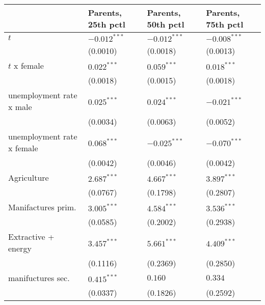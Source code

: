\begin{tabular}{llll}
\toprule
{} & Parents, 25th pctl & Parents, 50th pctl & Parents, 75th pctl \\
\midrule
$t$                                                &     $-0.012^{***}$ &     $-0.012^{***}$ &     $-0.008^{***}$ \\
                                                   &           (0.0010) &           (0.0018) &           (0.0013) \\
$t$ x female                                       &      $0.022^{***}$ &      $0.059^{***}$ &      $0.018^{***}$ \\
                                                   &           (0.0018) &           (0.0015) &           (0.0018) \\
unemployment rate x male                           &      $0.025^{***}$ &      $0.024^{***}$ &     $-0.021^{***}$ \\
                                                   &           (0.0034) &           (0.0063) &           (0.0052) \\
unemployment rate x female                         &      $0.068^{***}$ &     $-0.025^{***}$ &     $-0.070^{***}$ \\
                                                   &           (0.0042) &           (0.0046) &           (0.0042) \\
Agriculture                                        &      $2.687^{***}$ &      $4.667^{***}$ &      $3.897^{***}$ \\
                                                   &           (0.0767) &           (0.1798) &           (0.2807) \\
Manifactures prim.                                 &      $3.005^{***}$ &      $4.584^{***}$ &      $3.536^{***}$ \\
                                                   &           (0.0585) &           (0.2002) &           (0.2938) \\
Extractive + energy                                &      $3.457^{***}$ &      $5.661^{***}$ &      $4.409^{***}$ \\
                                                   &           (0.1116) &           (0.2369) &           (0.2850) \\
manifuctures sec.                                  &      $0.415^{***}$ &            $0.160$ &            $0.334$ \\
                                                   &           (0.0337) &           (0.1826) &           (0.2592) \\

\end{tabular}
